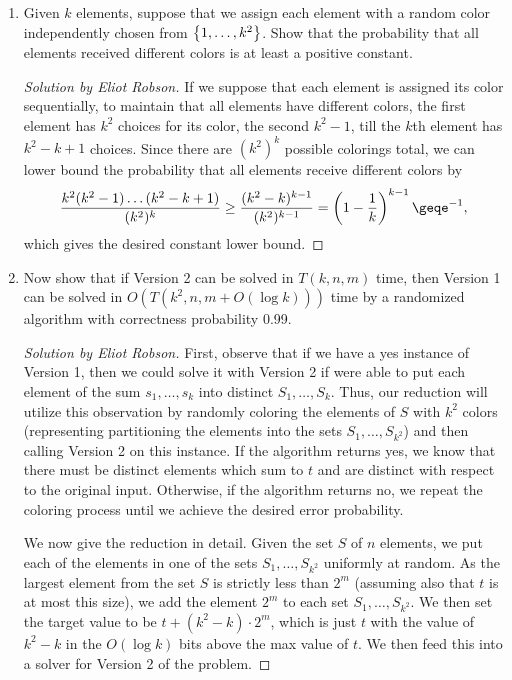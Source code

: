 \documentclass{article}
\newenvironment{solution}[1]{\begin{proof}[Solution by #1]}{\end{proof}}
\begin{document}
\begin{enumerate}
    \item Given \(k\) elements, suppose that we assign each element with a random color independently chosen from \(\set{1, \dots, k^2}\). Show that the probability that all elements received different colors is at least a positive constant.
    
    \begin{solution}{Eliot Robson}
        If we suppose that each element is assigned its color sequentially, to maintain that all elements have different colors, the first element has \(k^2\) choices for its color, the second \(k^2 - 1\), till the \(k\)th element has \(k^2 - k + 1\) choices. Since there are \((k^2)^k\) possible colorings total, we can lower bound the probability that all elements receive different colors by
        \[
            \frac{k^2 (k^2 - 1) \dots (k^2 - k + 1)}{(k^2)^k}
            \geq%
            \frac{(k^2 - k)^{k-1}}{(k^2)^{k-1}}
            =%
            \del{1 - \frac{1}{k}}^{k-1}
            \geq%
            e^{-1},
        \]
        which gives the desired constant lower bound.
    \end{solution}
    
    \item Now show that if Version 2 can be solved in \(T(k, n, m)\) time, then Version 1 can be solved in \(O(T(k^2, n, m + O(\log k)))\) time by a randomized algorithm with correctness probability 0.99.
    
    \begin{solution}{Eliot Robson}
        First, observe that if we have a yes instance of Version 1, then we could solve it with Version 2 if were able to put each element of the sum \(s_1, \dots, s_k\) into distinct \(S_1, \dots, S_k\). Thus, our reduction will utilize this observation by randomly coloring the elements of \(S\) with \(k^2\) colors (representing partitioning the elements into the sets \(S_1, \dots, S_{k^2}\)) and then calling Version 2 on this instance. If the algorithm returns yes, we know that there must be distinct elements which sum to \(t\) and are distinct with respect to the original input. Otherwise, if the algorithm returns no, we repeat the coloring process until we achieve the desired error probability.
        
        We now give the reduction in detail. Given the set \(S\) of \(n\) elements, we put each of the elements in one of the sets \(S_1, \dots, S_{k^2}\) uniformly at random. As the largest element from the set \(S\) is strictly less than \(2^m\) (assuming also that \(t\) is at most this size), we add the element \(2^m\) to each set \(S_1, \dots, S_{k^2}\). We then set the target value to be \(t + (k^2 - k) \cdot 2^m\), which is just \(t\) with the value of \(k^2 - k\) in the \(O(\log k)\) bits above the max value of \(t\). We then feed this into a solver for Version 2 of the problem.
        

\end{solution}
\end{enumerate}
\end{document}
